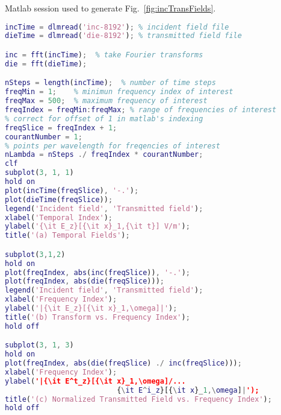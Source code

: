 \begin{program}
Matlab session used to generate Fig.\ \ref{fig:incTransFields}.
 \label{pro:transformFields}
\codemiddle
\begin{lstlisting}[language=Matlab]
incTime = dlmread('inc-8192'); % incident field file
dieTime = dlmread('die-8192'); % transmitted field file

inc = fft(incTime);  % take Fourier transforms
die = fft(dieTime);

nSteps = length(incTime);  % number of time steps
freqMin = 1;    % minimun frequency index of interest
freqMax = 500;  % maximum frequency of interest
freqIndex = freqMin:freqMax; % range of frequencies of interest
% correct for offset of 1 in matlab's indexing
freqSlice = freqIndex + 1;
courantNumber = 1;
% points per wavelength for freqencies of interest
nLambda = nSteps ./ freqIndex * courantNumber;
clf
subplot(3, 1, 1)
hold on
plot(incTime(freqSlice), '-.');
plot(dieTime(freqSlice));
legend('Incident field', 'Transmitted field');
xlabel('Temporal Index');
ylabel('{\it E_z}[{\it x}_1,{\it t}] V/m');
title('(a) Temporal Fields');

subplot(3,1,2)
hold on
plot(freqIndex, abs(inc(freqSlice)), '-.');
plot(freqIndex, abs(die(freqSlice)));
legend('Incident field', 'Transmitted field');
xlabel('Frequency Index');
ylabel('|{\it E_z}[{\it x}_1,\omega]|');
title('(b) Transform vs. Frequency Index');
hold off

subplot(3, 1, 3)
hold on
plot(freqIndex, abs(die(freqSlice) ./ inc(freqSlice)));
xlabel('Frequency Index');
ylabel('|{\it E^t_z}[{\it x}_1,\omega]/...
                          {\it E^i_z}[{\it x}_1,\omega]|');
title('(c) Normalized Transmitted Field vs. Frequency Index');
hold off
\end{lstlisting}
\end{program}

